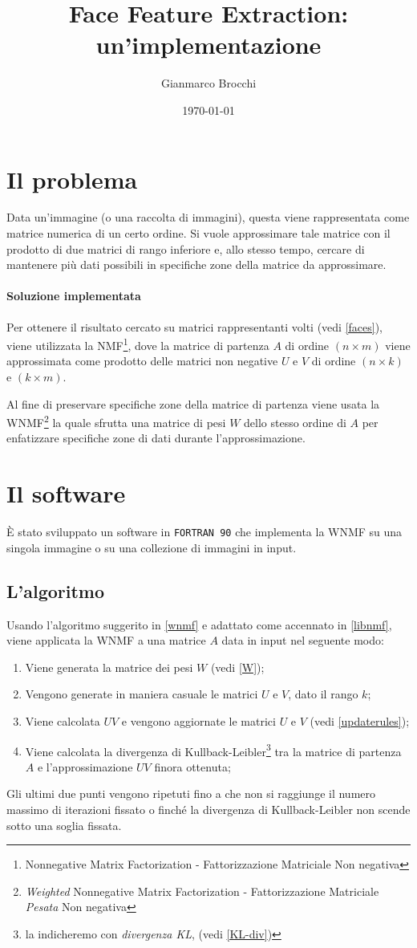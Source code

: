 \documentclass[a4paper]{article} %
\author{Gianmarco Brocchi}
\title{Face Feature Extraction: un'implementazione}
\date{\today}
\begin{document}
\maketitle

\section{Il problema}
Data un'immagine (o una raccolta di immagini), questa viene rappresentata come matrice numerica di un certo ordine. Si vuole approssimare tale matrice con il prodotto di due matrici di rango inferiore e, allo stesso tempo, cercare di mantenere più dati possibili in specifiche zone della matrice da approssimare.

\paragraph{Soluzione implementata}
Per ottenere il risultato cercato su matrici rappresentanti volti (vedi \ref{faces}), viene utilizzata la NMF\footnote{Nonnegative Matrix Factorization - Fattorizzazione Matriciale Non negativa}, dove la matrice di partenza $A$ di ordine $(n \times m)$ viene approssimata come prodotto delle matrici non negative $U$ e $V$ di ordine $(n \times k)$ e $(k \times m)$.

Al fine di preservare specifiche zone della matrice di partenza viene usata la WNMF\footnote{\emph{Weighted} Nonnegative Matrix Factorization - Fattorizzazione Matriciale \emph{Pesata} Non negativa} la quale sfrutta una matrice di pesi $W$ dello stesso ordine di $A$ per enfatizzare specifiche zone di dati durante l'approssimazione.

\section{Il software}
È stato sviluppato un software in \texttt{FORTRAN 90} che implementa la WNMF su una singola immagine o su una collezione di immagini in input.

\subsection{L'algoritmo}
Usando l'algoritmo suggerito in \ref{wnmf} e adattato come accennato in \ref{libnmf}, viene applicata la WNMF a una matrice $A$ data in input nel seguente modo:
\begin{enumerate}
\item Viene generata la matrice dei pesi $W$ (vedi \ref{W});
\item Vengono generate in maniera casuale le matrici $U$ e $V$, dato il rango $k$;
\item Viene calcolata $UV$ e vengono aggiornate le matrici $U$ e $V$ (vedi \ref{updaterules});
\item Viene calcolata la divergenza di Kullback-Leibler\footnote{la indicheremo con \emph{divergenza KL}, (vedi \ref{KL-div})} tra la matrice di partenza $A$ e l'approssimazione $UV$ finora ottenuta;
\end{enumerate}
Gli ultimi due punti vengono ripetuti fino a che non si raggiunge il numero massimo di iterazioni fissato o finché la divergenza di Kullback-Leibler non scende sotto una soglia fissata.
\end{document}
